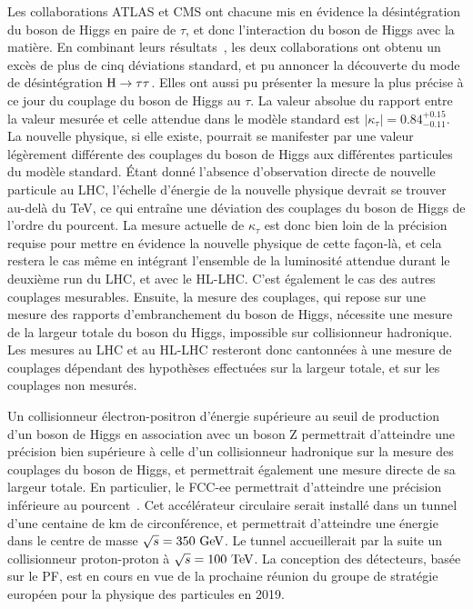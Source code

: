 Les collaborations ATLAS et CMS ont chacune mis en évidence la désintégration du boson de Higgs en paire de $\tau$, et donc l'interaction du boson de Higgs avec la matière. 
En combinant leurs résultats~\cite{higgs_coupling_ATLAS_CMS_Aad2016}, les deux collaborations ont obtenu un excès de plus de cinq déviations standard, et pu annoncer la découverte du mode de désintégration $\mathrm{H} \to \tau \tau$. 
Elles ont aussi pu présenter la mesure la plus précise à ce jour du couplage du boson de Higgs au $\tau$. 
La valeur absolue du rapport entre la valeur mesurée et celle attendue dans le modèle standard est $|\kappa_\tau| = 0.84^{+0.15}_{-0.11}$. 
La nouvelle physique, si elle existe, pourrait se manifester par une valeur légèrement différente des couplages du boson de Higgs aux différentes particules du modèle standard. 
Étant donné l'absence d'observation directe de nouvelle particule au LHC, 
l'échelle d'énergie de la nouvelle physique devrait se trouver au-delà du TeV, 
ce qui entraîne une déviation des couplages du boson de Higgs de l'ordre du pourcent. 
La mesure actuelle de $\kappa_\tau$ est donc bien loin de la précision requise pour mettre en évidence la nouvelle physique de cette façon-là, et cela restera le cas même en intégrant l'ensemble de la luminosité attendue durant le deuxième run du LHC, et avec le HL-LHC. 
C'est également le cas des autres couplages mesurables. 
Ensuite, la mesure des couplages, qui repose sur une mesure des rapports d'embranchement du boson de Higgs, nécessite une mesure de la largeur totale du boson du Higgs, 
impossible sur collisionneur hadronique. 
Les mesures au LHC et au HL-LHC resteront donc cantonnées à une mesure de couplages dépendant des hypothèses effectuées sur la largeur totale, et sur les couplages non mesurés. 

Un collisionneur électron-positron d'énergie supérieure au seuil de production d'un boson de Higgs en association avec un boson Z permettrait d'atteindre une précision bien supérieure à celle d'un collisionneur hadronique sur la mesure des couplages du boson de Higgs, et permettrait également une mesure directe de sa largeur totale.
En particulier, le FCC-ee permettrait d'atteindre une précision inférieure au pourcent~\cite{Gomez-Ceballos:2013zzn}. 
Cet accélérateur circulaire serait installé dans un tunnel d'une centaine de km de circonférence, 
et permettrait d'atteindre une énergie dans le centre de masse $\sqrt{s} = 350\,\,\text{Ge\hspace{-.08em}V}$. 
Le tunnel accueillerait par la suite un collisionneur proton-proton à $\sqrt{s} = 100\,\,\text{Te\hspace{-.08em}V}$.
La conception des détecteurs, basée sur le PF, est en cours en vue de la prochaine réunion du groupe de stratégie européen pour la physique des particules en 2019.

